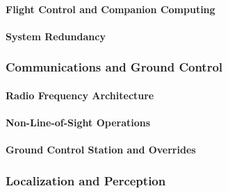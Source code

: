 \paragraph{Flight Control and Companion Computing}
\label{par:flight_control_companion_computing}


\paragraph{System Redundancy}
\label{par:system_redundancy}


\subsubsection{Communications and Ground Control}
\label{subsubsec:communications_ground_control}

\paragraph{Radio Frequency Architecture}
\label{par:radio_frequency_architecture}


\paragraph{Non-Line-of-Sight Operations}
\label{par:non_line_of_sight_operations}


\paragraph{Ground Control Station and Overrides}
\label{par:ground_control_station_overrides}


\subsubsection{Localization and Perception}
\label{subsubsec:localization_perception}

